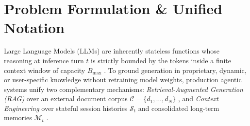 \documentclass[../../../../master.tex]{subfiles}
\begin{document}

\section{Problem Formulation \& Unified Notation}
\label{sec:rag:formulation}

Large Language Models (LLMs) are inherently stateless functions whose reasoning at inference turn $t$ is strictly bounded by the tokens inside a finite context window of capacity $B_{\max}$ . To ground generation in proprietary, dynamic, or user-specific knowledge without retraining model weights, production agentic systems unify two complementary mechanisms: \emph{Retrieval-Augmented Generation (RAG)} over an external document corpus $\mathcal{C} = \{d_1, \dots, d_N\}$ , and \emph{Context Engineering} over stateful session histories $\mathcal{S}_t$ and consolidated long-term memories $\mathcal{M}_t$ .
\end{document}
